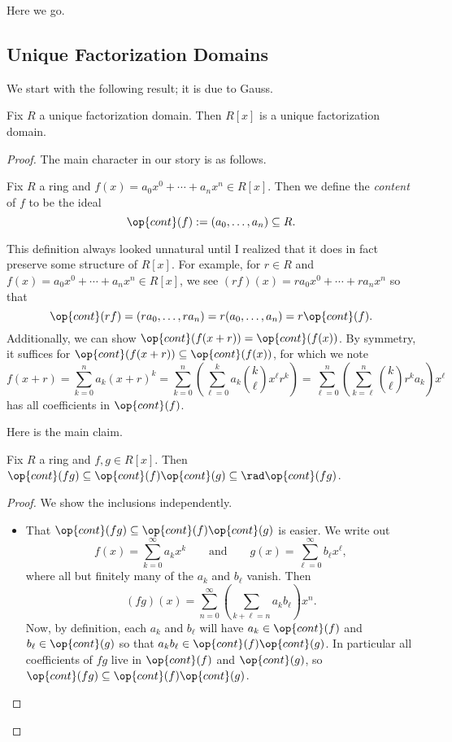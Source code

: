 
Here we go.

\subsection{Unique Factorization Domains}

We start with the following result; it is due to Gauss.
\begin{theorem} \label{thm:rxisufd}
	Fix $R$ a unique factorization domain. Then $R[x]$ is a unique factorization domain.
\end{theorem}
\begin{proof}
	The main character in our story is as follows.
	\begin{definition}[Content]
		Fix $R$ a ring and $f(x)=a_0x^0+\cdots+a_nx^n\in R[x]$. Then we define the \textit{content} of $f$ to be the ideal
		\[\op{cont}(f):=(a_0,\ldots,a_n)\subseteq R.\]
	\end{definition}
	\begin{remark}[Nir]
		This definition always looked unnatural until I realized that it does in fact preserve some structure of $R[x]$. For example, for $r\in R$ and $f(x)=a_0x^0+\cdots+a_nx^n\in R[x]$, we see $(rf)(x)=ra_0x^0+\cdots+ra_nx^n$ so that
		\[\op{cont}(rf)=(ra_0,\ldots,ra_n)=r(a_0,\ldots,a_n)=r\op{cont}(f).\]
		Additionally, we can show $\op{cont}(f(x+r))=\op{cont}(f(x))$. By symmetry, it suffices for $\op{cont}(f(x+r))\subseteq\op{cont}(f(x))$, for which we note
		\[f(x+r)=\sum_{k=0}^na_k(x+r)^k=\sum_{k=0}^n\left(\sum_{\ell=0}^ka_k\binom k\ell x^\ell r^k\right)=\sum_{\ell=0}^n\left(\sum_{k=\ell}^n\binom k\ell r^ka_k\right)x^\ell\]
		has all coefficients in $\op{cont}(f)$.
	\end{remark}
	Here is the main claim.
	\begin{lemma}[Gauss] \label{lem:gauss}
		Fix $R$ a ring and $f,g\in R[x]$. Then $\op{cont}(fg)\subseteq\op{cont}(f)\op{cont}(g)\subseteq\rad\op{cont}(fg)$.
	\end{lemma}
	\begin{proof}
		We show the inclusions independently.
		\begin{itemize}
			\item That $\op{cont}(fg)\subseteq\op{cont}(f)\op{cont}(g)$ is easier. We write out
			\[f(x)=\sum_{k=0}^\infty a_kx^k\qquad\text{and}\qquad g(x)=\sum_{\ell=0}^\infty b_\ell x^\ell,\]
			where all but finitely many of the $a_k$ and $b_\ell$ vanish. Then
			\[(fg)(x)=\sum_{n=0}^\infty\left(\sum_{k+\ell=n}a_kb_\ell\right)x^n.\]
			Now, by definition, each $a_k$ and $b_\ell$ will have $a_k\in\op{cont}(f)$ and $b_\ell\in\op{cont}(g)$ so that $a_kb_\ell\in\op{cont}(f)\op{cont}(g)$. In particular all coefficients of $fg$ live in $\op{cont}(f)$ and $\op{cont}(g)$, so $\op{cont}(fg)\subseteq\op{cont}(f)\op{cont}(g)$.


\end{itemize}
\end{proof}
\end{proof}
